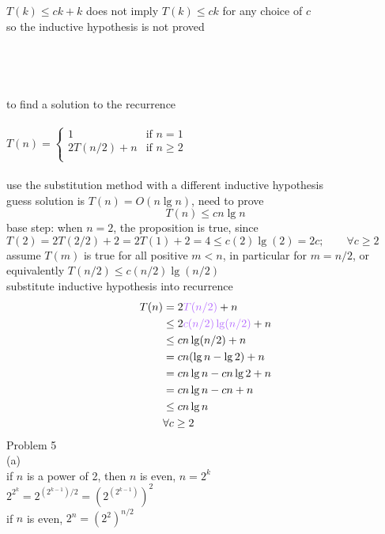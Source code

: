 \documentclass[12pt,border=4pt,multi]{article}%
\begin{document}
$T(k) \leq ck + k$ does not imply $T(k) \leq ck$ for any choice of $c$\\
so the inductive hypothesis is not proved\\
\\
\\
\\
\\
to find a solution to the recurrence\\
\\
$T(n) =
\begin{cases}
1 & \text{if } n = 1\\
2T(n/2) + n & \text{if } n \geq 2\\
\end{cases}$\\
\\
use the substitution method with a different inductive hypothesis\\
guess solution is $T(n) = O(n\lg n)$, need to prove 
\[T(n) \leq cn\lg n\]
base step: when $n = 2$, the proposition is true, since $T(2) = 2T(2/2) + 2 = 2T(1) + 2 = 4 \leq c(2)\lg(2) = 2c; \qquad \forall c \geq 2$ \\
assume $T(m)$ is true for all positive $m < n$, in particular for $m = n / 2$, or equivalently $T(n / 2) \leq c(n / 2)\lg(n / 2)$\\
substitute inductive hypothesis into recurrence
\begin{align*}
   T(n) &= 2\textcolor{orchid}{T(n / 2)} + n\\
   &\leq 2\textcolor{orchid}{c(n / 2)\lg(n / 2)} + n\\
   &\leq cn\lg(n / 2) + n\\
   &= cn(\lg n - \lg 2) + n\\
   &= cn\lg n - cn\lg 2 + n\\
   &= cn\lg n - cn + n\\
   &\leq cn\lg n\\
   &\forall c \geq 2\\
\end{align*}
\newpage
\noindent
Problem 5\\
(a)\\
if $n$ is a power of 2, then $n$ is even, $n = 2^k$\\
{\large
$2^{2^k} = 2^{(2^{k - 1})/2} = \left(2^{(2^{k - 1})}\right)^2$\\ 
}
if $n$ is even, {\large$2^n = (2^2)^{n/2}$}\\
\\
\\
\\
\end{document}
